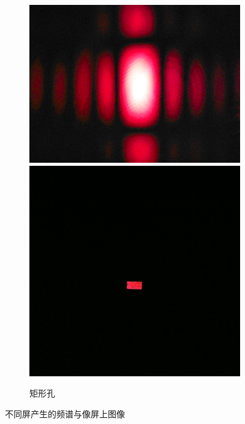 \documentclass[a4paper]{article}
\begin{document}
\begin{figure}[htbp]
\begin{subfigure}[htbp]{0.3\textwidth}
        \includegraphics[width=\textwidth]{fre-done/2-4.JPG}
        \includegraphics[width=\textwidth]{img-done/2-4.JPG}
        \caption{矩形孔}
        \label{2-4}
    \end{subfigure}
    \captionsetup{format=cont,justification=centering,subrefformat=parens}
    \caption{不同屏产生的频谱与像屏上图像}
\end{figure}
\end{document}
